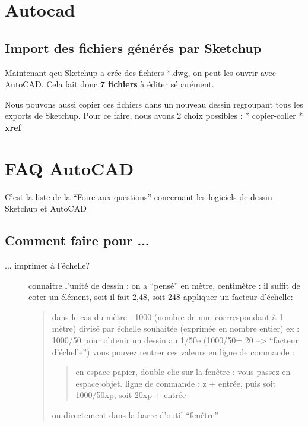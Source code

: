 \documentclass[a4paper,12pt,french]{sphinxmanual}
\begin{document}
\section{Autocad}
\label{acad/acad:autocad}\label{acad/acad:acad}\label{acad/acad::doc}

\subsection{Import des fichiers générés par Sketchup}
\label{acad/acad:import-des-fichiers-generes-par-sketchup}
Maintenant qeu Sketchup a crée des fichiers *.dwg, on peut les ouvrir avec AutoCAD. Cela fait donc \textbf{7 fichiers} à éditer séparément.

Nous pouvons aussi copier ces fichiers dans un nouveau dessin regroupant tous les exports de Sketchup. Pour ce faire, nous avons 2 choix possibles :
* copier-coller
* \textbf{xref}


\section{FAQ AutoCAD}
\label{acad/faq_acad:faq-acad}\label{acad/faq_acad:faq-autocad}\label{acad/faq_acad::doc}
C'est la liste de la ``Foire aux questions'' concernant les logiciels de dessin Sketchup et AutoCAD


\subsection{Comment faire pour ...}
\label{acad/faq_acad:comment-faire-pour}\begin{description}
\item[{... imprimer à l'échelle?}] \leavevmode
connaitre l'unité de dessin : on a ``pensé'' en mètre, centimètre : il suffit de coter un élément, soit il fait 2,48, soit 248
appliquer un facteur d'échelle:
\begin{quote}

dans le cas du mètre : 1000 (nombre de mm corrrespondant à 1 mètre) divisé par échelle souhaitée (exprimée en nombre entier)
ex :  1000/50 pour obtenir un dessin au 1/50e (1000/50= 20 --\textgreater{} ``facteur d'échelle'')
vous pouvez rentrer ces valeurs en ligne de commande :
\begin{quote}

en espace-papier, double-clic sur la fenêtre : vous passez en espace objet.
ligne de commande : z +  entrée, puis soit 1000/50xp, soit 20xp + entrée
\end{quote}

ou directement dans la barre d'outil ``fenêtre''
\end{quote}

\end{description}
\end{document}
